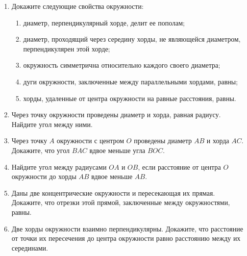 \documentclass[12pt, a4paper]{article}
\begin{document}
	
	\begin{enumerate}
		\item Докажите следующие свойства окружности:
			\begin{enumerate}[label=\asbuk*)]
			\item  диаметр, перпендикулярный хорде, делит ее пополам;
			\item  диаметр, проходящий через середину хорды, не являющейся диаметром, перпендикулярен этой хорде;
			\item окружность симметрична относительно каждого своего
			диаметра;
			\item  дуги окружности, заключенные между параллельными
			хордами, равны;
			\item  хорды, удаленные от центра окружности на равные расстояния, равны.
			\end{enumerate}
		\item Через точку окружности проведены диаметр и хорда, равная радиусу. Найдите угол между ними.
		\item Через точку $A$ окружности с центром $O$ проведены диаметр $AB$ и хорда $AC$. Докажите, что угол $BAC$ вдвое меньше угла $BOC$.
		\item Найдите угол между радиусами $OA$ и $OB$, если расстояние от центра $O$ окружности до хорды $AB$ вдвое меньше $AB$.
		\item Даны две концентрические окружности и пересекающая их прямая. Докажите, что отрезки этой прямой, заключенные между окружностями, равны.
		\item Две хорды окружности взаимно перпендикулярны. Докажите, что расстояние от точки их пересечения до центра окружности равно расстоянию между их серединами.
	\end{enumerate}
\end{document}
